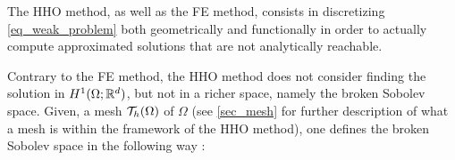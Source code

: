 \documentclass[fleqn]{article}
\begin{document}
      The HHO method, as well as the FE method, consists in discretizing \eqref{eq_weak_problem} both geometrically and functionally in order to actually compute approximated solutions that are not analytically reachable.
      \par
      Contrary to the FE method, the HHO method does not consider finding the solution in $H^{1}(\Omega; \mathbb{R}^{d})$, but not in a richer space, namely the broken Sobolev space. Given, a mesh $\mathcal{T}_h(\Omega)$ of $\Omega$ (see \ref{sec_mesh} for further description of what a mesh is within the framework of the HHO method), one defines the broken Sobolev space in the following way :
\end{document}
